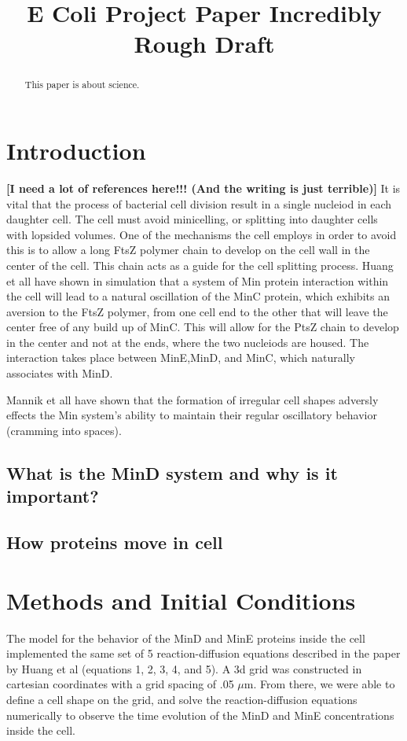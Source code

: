 \documentclass[letterpaper,twocolumn,amsmath,amssymb,pre]{revtex4-1}
\newcommand{\red}[1]{{\bf \color{red} #1}}
\newcommand{\fixme}[1]{\red{[#1]}}
\begin{document}
\title{E Coli Project Paper Incredibly Rough Draft}

\begin{abstract}
  This paper is about science.
\end{abstract}
\section{Introduction}
\fixme{I need a lot of references here!!!  (And the writing is just terrible)}
It is vital that the process of bacterial cell division result in a single nucleiod in each daughter cell.  The cell must avoid minicelling, or splitting into daughter cells with lopsided volumes.  One of the mechanisms the cell employs in order to avoid this is to allow a long FtsZ polymer chain to develop on the cell wall in the center of the cell.  This chain acts as a guide for the cell splitting process.  Huang et all have shown in simulation that a system of Min protein interaction within the cell will lead to a natural oscillation of the MinC protein, which exhibits an aversion to the FtsZ polymer, from one cell end to the other that will leave the center free of any build up of MinC.  This will allow for the PtsZ chain to develop in the center and not at the ends, where the two nucleiods are housed.  The interaction takes place between MinE,MinD, and MinC, which naturally associates with MinD.

Mannik et all have shown that the formation of irregular cell shapes adversly effects the Min system's ability to maintain their regular oscillatory behavior (cramming into spaces).

\subsection{What is the MinD system and why is it important?}
\subsection{How proteins move in cell}
\section{Methods and Initial Conditions}
The model for the behavior of the MinD and MinE proteins inside the cell
implemented the same set of 5 reaction-diffusion equations described in the paper
by Huang et al (equations 1, 2, 3, 4, and 5). A 3d grid was constructed in
cartesian coordinates with a grid spacing of .05 $\mu$m. From there, we
were able to define a cell shape on the grid, and solve the
reaction-diffusion equations numerically to observe the time evolution of
the MinD and MinE concentrations inside the cell.
\end{document}
